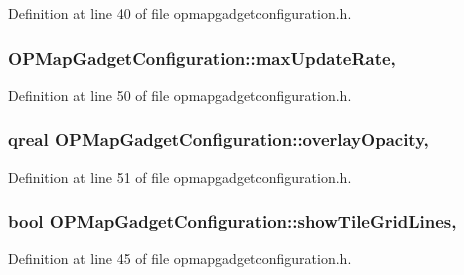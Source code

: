 Definition at line 40 of file opmapgadgetconfiguration.\-h.

\hypertarget{group___o_p_map_plugin_ga3ab3b510f0eb2b7cd3b183275eba0be1}{
\subsubsection[{max\-Update\-Rate}]{ O\-P\-Map\-Gadget\-Configuration\-::max\-Update\-Rate\hspace{0.3cm}{\ttfamily [read]}, {\ttfamily [write]}}}\label{group___o_p_map_plugin_ga3ab3b510f0eb2b7cd3b183275eba0be1}


Definition at line 50 of file opmapgadgetconfiguration.\-h.

\hypertarget{group___o_p_map_plugin_gaf1bf43458d17cdb95a80a889c5508945}{
\subsubsection[{overlay\-Opacity}]{\setlength{\rightskip}{0pt plus 5cm}qreal O\-P\-Map\-Gadget\-Configuration\-::overlay\-Opacity\hspace{0.3cm}{\ttfamily [read]}, {\ttfamily [write]}}}\label{group___o_p_map_plugin_gaf1bf43458d17cdb95a80a889c5508945}


Definition at line 51 of file opmapgadgetconfiguration.\-h.

\hypertarget{group___o_p_map_plugin_gaa46dc27228fb9c47c0c10f520d6099ab}{
\subsubsection[{show\-Tile\-Grid\-Lines}]{\setlength{\rightskip}{0pt plus 5cm}bool O\-P\-Map\-Gadget\-Configuration\-::show\-Tile\-Grid\-Lines\hspace{0.3cm}{\ttfamily [read]}, {\ttfamily [write]}}}\label{group___o_p_map_plugin_gaa46dc27228fb9c47c0c10f520d6099ab}


Definition at line 45 of file opmapgadgetconfiguration.\-h.

